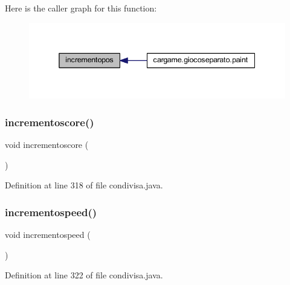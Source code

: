 Here is the caller graph for this function\+:
\nopagebreak
\begin{figure}[H]
\begin{center}
\leavevmode
\includegraphics[width=338pt]{classcargame_1_1condivisa_a67792a3a709b780ba197a7a90146235f_icgraph}
\end{center}
\end{figure}
\mbox{\label{classcargame_1_1condivisa_abe3e2d27707b3c79441cae6d9d59296f}} 
\subsubsection{\texorpdfstring{incrementoscore()}{incrementoscore()}}
{\footnotesize\ttfamily void incrementoscore (\begin{DoxyParamCaption}{ }\end{DoxyParamCaption})}



Definition at line 318 of file condivisa.\+java.

\mbox{\label{classcargame_1_1condivisa_afdb352ea73981b978cd227f30f58779c}} 
\subsubsection{\texorpdfstring{incrementospeed()}{incrementospeed()}}
{\footnotesize\ttfamily void incrementospeed (\begin{DoxyParamCaption}{ }\end{DoxyParamCaption})}



Definition at line 322 of file condivisa.\+java.

\mbox{\label{classcargame_1_1condivisa_a54112d941742c218419e82d00f4d3490}} 
